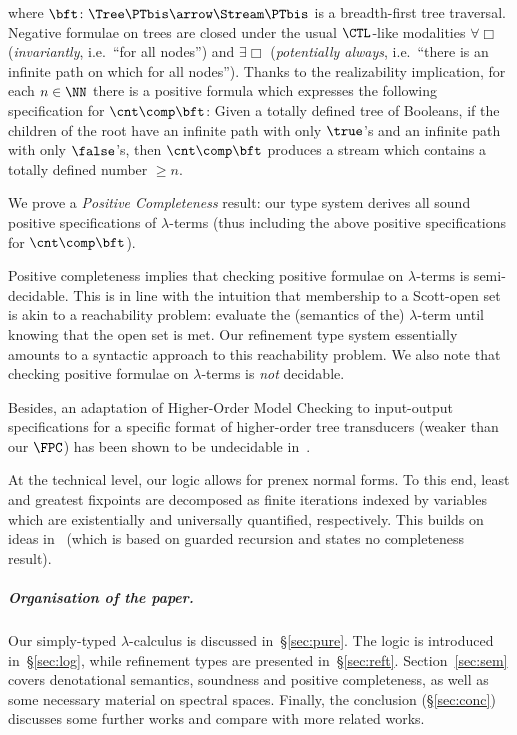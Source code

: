 \noindent
where $\bft \colon \Tree \PTbis \arrow \Stream \PTbis$
is a breadth-first tree traversal.
Negative formulae on trees are closed under
the usual $\CTL$-like modalities $\forall\Box$
(\emph{invariantly}, i.e.\ ``for all nodes'')
and $\exists\Box$
(\emph{potentially always},
i.e.\ ``there is an infinite path on which for all nodes'').
Thanks to the realizability implication, 
for each $n \in \NN$ there is a positive
formula which expresses the following specification for $\cnt \comp \bft$:
Given a totally defined tree of Booleans,
if the children of the root have an infinite path with only $\true$'s
and an infinite path with only $\false$'s,
then $\cnt \comp \bft$ produces a stream which contains a totally
defined number $\geq n$.

We prove a \emph{Positive Completeness} result: our type system
derives all sound positive specifications of $\lambda$-terms
(thus including the above positive specifications for $\cnt \comp \bft$).

Positive completeness implies that
checking positive formulae on $\lambda$-terms is semi-decidable.
This is in line with the intuition that 
membership to a Scott-open set is akin to a reachability problem:
evaluate the (semantics of the) $\lambda$-term until knowing that the open set is met.
Our refinement type system essentially amounts to a
syntactic approach to this reachability problem.
%
We also note that checking positive formulae on $\lambda$-terms
is \emph{not} decidable.

Besides, an adaptation of Higher-Order Model Checking
to input-output specifications for a specific format
of higher-order tree transducers (weaker than our $\FPC$)
has been shown to be undecidable in~\cite{ktu10popl}.

At the technical level, 
our logic allows for prenex normal forms.
To this end, least and greatest fixpoints are decomposed
as finite iterations indexed by variables which are
existentially and universally quantified, respectively.
This builds on ideas in~\cite{jr21esop}
(which is based on guarded recursion and states no completeness result).


\subparagraph{Organisation of the paper.}
Our simply-typed $\lambda$-calculus is discussed in~\S\ref{sec:pure}.
The logic is introduced in~\S\ref{sec:log},
while refinement types are presented in~\S\ref{sec:reft}.
Section~\ref{sec:sem} covers denotational semantics,
soundness and positive completeness,
as well as some necessary material on spectral spaces.
Finally, the conclusion (\S\ref{sec:conc}) discusses some further works
and compare with more related works.
%
%





